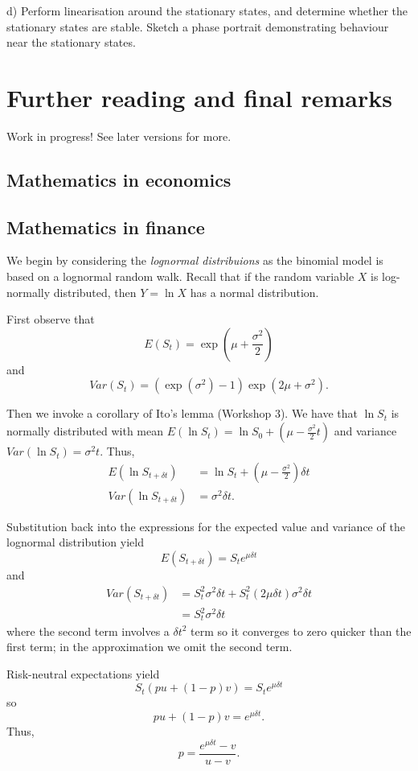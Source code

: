 \documentclass[a4paper, 12pt,oneside,openany]{book}
\begin{document}
d) Perform linearisation around the stationary states, and determine whether the stationary states are stable. Sketch a phase portrait demonstrating behaviour near the stationary states.

\chapter{Further reading and final remarks}

Work in progress! See later versions for more.

\section{Mathematics in economics}

\section{Mathematics in finance}

We begin by considering the \emph{lognormal distribuions} as the binomial model is based on a lognormal random walk. Recall that if the random variable $X$ is log-normally distributed, then $Y=\ln X$ has a normal distribution. 

First observe that $$E(S_t)=\exp(\mu+\frac{\sigma^2}{2})$$ and $$Var(S_t) = (\exp(\sigma^2)-1)\exp(2\mu+\sigma^2).$$

Then we invoke a corollary of Ito's lemma (Workshop 3). We have that $\ln S_t$ is normally distributed with mean $E(\ln S_t)=\ln S_0+(\mu-\frac{\sigma^2}{2}t)$ and variance $Var(\ln S_t)=\sigma^2 t$. Thus, \begin{align*} E(\ln S_{t+\delta t}) &= \ln S_t + (\mu-\frac{\sigma^2}{2}) \delta t \\ Var(\ln S_{t+\delta t}) &= \sigma^2 \delta t. \end{align*}

Substitution back into the expressions for the expected value and variance of the lognormal distribution yield $$E(S_{t+\delta t}) = S_t e^{\mu \delta t}$$ and \begin{align*} Var(S_{t+\delta t}) &= S_t^2 \sigma^2 \delta t+ S_t^2 (2\mu \delta t) \sigma^2 \delta t \\ &= S_t^2 \sigma^2 \delta t\end{align*} where the second term involves a $\delta t^2$ term so it converges to zero quicker than the first term; in the approximation we omit the second term. 

Risk-neutral expectations yield $$S_t(pu+(1-p)v) = S_t e^{\mu \delta t}$$ so $$pu+(1-p)v = e^{\mu \delta t}.$$ Thus, $$p=\frac{e^{\mu \delta t}-v}{u-v}.$$ 
\end{document}
